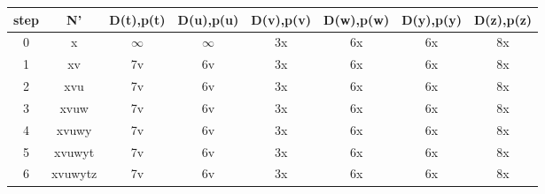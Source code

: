 \documentclass[12pt]{article}
\begin{document}
\begin{enumerate}
\begin{tabular}{c|c|c|c|c|c|c|c}
			step & N' &D(t),p(t)&D(u),p(u)&D(v),p(v)&D(w),p(w)&D(y),p(y)&D(z),p(z)\\
			\hline
			0 & x & $\infty$ & $\infty$ & 3x & 6x & 6x & 8x\\
			1 & xv & 7v & 6v & 3x & 6x & 6x & 8x\\
			2 & xvu & 7v & 6v & 3x & 6x & 6x & 8x\\
			3 & xvuw & 7v & 6v & 3x & 6x & 6x & 8x\\
			4 & xvuwy & 7v & 6v & 3x & 6x & 6x & 8x\\
			5 & xvuwyt & 7v & 6v & 3x & 6x & 6x & 8x\\
			6 & xvuwytz & 7v & 6v & 3x & 6x & 6x & 8x\\


		\end{tabular}
		\normalsize


\end{enumerate}
\end{document}
